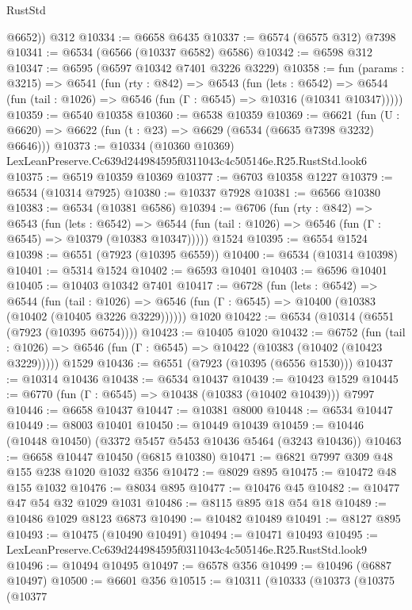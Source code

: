 \begin{lexlean}{RustStd}
\begin{coremodule}
        @6652))
    @312
@10334 := @6658 @6435
@10337 := @6574 (@6575 @312) @7398
@10341 := @6534 (@6566 (@10337 @6582) @6586)
@10342 := @6598 @312
@10347 := @6595 (@6597 @10342 @7401 @3226 @3229)
@10358 := fun (params : @3215) =>
  @6541
    (fun (rty : @842) =>
    @6543
      (fun (lets : @6542) =>
      @6544 (fun (tail : @1026) => @6546 (fun (Γ : @6545) => @10316 (@10341 @10347)))))
@10359 := @6540 @10358
@10360 := @6538 @10359
@10369 := @6621
    (fun (U : @6620) => @6622 (fun (t : @23) => @6629 (@6534 (@6635 @7398 @3232) @6646)))
@10373 := @10334 (@10360 @10369) LexLeanPreserve.Cc639d244984595f0311043c4c505146e.R25.RustStd.look6
@10375 := @6519 @10359 @10369
@10377 := @6703 @10358 @1227
@10379 := @6534 (@10314 @7925)
@10380 := @10337 @7928
@10381 := @6566 @10380
@10383 := @6534 (@10381 @6586)
@10394 := @6706
    (fun (rty : @842) =>
    @6543
      (fun (lets : @6542) =>
      @6544 (fun (tail : @1026) => @6546 (fun (Γ : @6545) => @10379 (@10383 @10347)))))
    @1524
@10395 := @6554 @1524
@10398 := @6551 (@7923 (@10395 @6559))
@10400 := @6534 (@10314 @10398)
@10401 := @5314 @1524
@10402 := @6593 @10401
@10403 := @6596 @10401
@10405 := @10403 @10342 @7401
@10417 := @6728
    (fun (lets : @6542) =>
    @6544
      (fun (tail : @1026) =>
      @6546 (fun (Γ : @6545) => @10400 (@10383 (@10402 (@10405 @3226 @3229))))))
    @1020
@10422 := @6534 (@10314 (@6551 (@7923 (@10395 @6754))))
@10423 := @10405 @1020
@10432 := @6752
    (fun (tail : @1026) => @6546 (fun (Γ : @6545) => @10422 (@10383 (@10402 (@10423 @3229)))))
    @1529
@10436 := @6551 (@7923 (@10395 (@6556 @1530)))
@10437 := @10314 @10436
@10438 := @6534 @10437
@10439 := @10423 @1529
@10445 := @6770 (fun (Γ : @6545) => @10438 (@10383 (@10402 @10439))) @7997
@10446 := @6658 @10437
@10447 := @10381 @8000
@10448 := @6534 @10447
@10449 := @8003 @10401
@10450 := @10449 @10439
@10459 := @10446 (@10448 @10450) (@3372 @5457 @5453 @10436 @5464 (@3243 @10436))
@10463 := @6658 @10447 @10450 (@6815 @10380)
@10471 := @6821 @7997 @309 @48 @155 @238 @1020 @1032 @356
@10472 := @8029 @895
@10475 := @10472 @48 @155 @1032
@10476 := @8034 @895
@10477 := @10476 @45
@10482 := @10477 @47 @54 @32 @1029 @1031
@10486 := @8115 @895 @18 @54 @18
@10489 := @10486 @1029 @8123 @6873
@10490 := @10482 @10489
@10491 := @8127 @895
@10493 := @10475 (@10490 @10491)
@10494 := @10471 @10493
@10495 := LexLeanPreserve.Cc639d244984595f0311043c4c505146e.R25.RustStd.look9
@10496 := @10494 @10495
@10497 := @6578 @356
@10499 := @10496 (@6887 @10497)
@10500 := @6601 @356
@10515 := @10311
    (@10333
      (@10373
        (@10375
          (@10377

\end{coremodule}
\end{lexlean}
